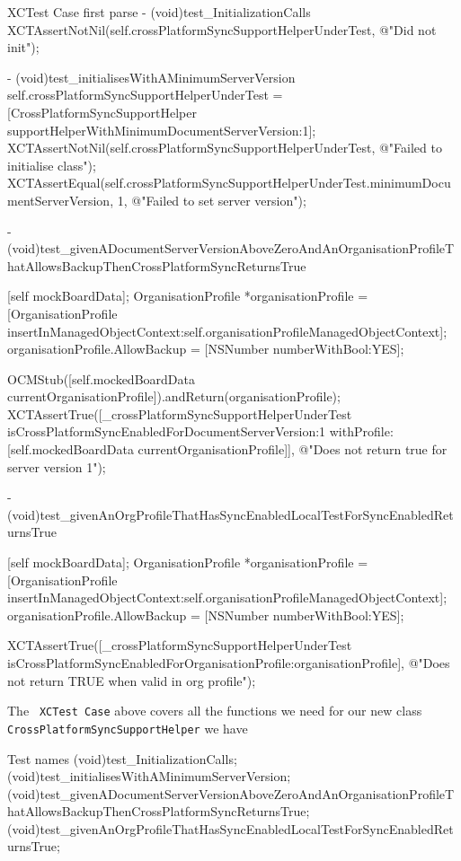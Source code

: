 \documentclass[a4paper, titlepage]{article}
\begin{document}
  \begin{listbox}{1}{XCTest Case first parse}
      - (void)test_InitializationCalls
      {
          XCTAssertNotNil(self.crossPlatformSyncSupportHelperUnderTest, @"Did not init");
      }

      - (void)test_initialisesWithAMinimumServerVersion
      {
          self.crossPlatformSyncSupportHelperUnderTest = [CrossPlatformSyncSupportHelper supportHelperWithMinimumDocumentServerVersion:1];
          XCTAssertNotNil(self.crossPlatformSyncSupportHelperUnderTest, @"Failed to initialise class");
          XCTAssertEqual(self.crossPlatformSyncSupportHelperUnderTest.minimumDocumentServerVersion, 1, @"Failed to set server version");
      }

      - (void)test_givenADocumentServerVersionAboveZeroAndAnOrganisationProfileThatAllowsBackupThenCrossPlatformSyncReturnsTrue
      {
          [self mockBoardData];
          OrganisationProfile *organisationProfile = [OrganisationProfile insertInManagedObjectContext:self.organisationProfileManagedObjectContext];
          organisationProfile.AllowBackup = [NSNumber numberWithBool:YES];

          OCMStub([self.mockedBoardData currentOrganisationProfile]).andReturn(organisationProfile);
          XCTAssertTrue([_crossPlatformSyncSupportHelperUnderTest
          isCrossPlatformSyncEnabledForDocumentServerVersion:1
          withProfile: [self.mockedBoardData currentOrganisationProfile]], @"Does not return true for server version 1");
      }

      - (void)test_givenAnOrgProfileThatHasSyncEnabledLocalTestForSyncEnabledReturnsTrue
      {
          [self mockBoardData];
          OrganisationProfile *organisationProfile = [OrganisationProfile insertInManagedObjectContext:self.organisationProfileManagedObjectContext];
          organisationProfile.AllowBackup = [NSNumber numberWithBool:YES];

          XCTAssertTrue([_crossPlatformSyncSupportHelperUnderTest isCrossPlatformSyncEnabledForOrganisationProfile:organisationProfile], @"Does not return TRUE when valid in org profile");
      }
  \end{listbox}

  The \texttt{ XCTest Case} above covers all the functions we
  need for our new class 
  \texttt{CrossPlatformSyncSupportHelper} we have

    \begin{listbox}{1}{Test names}
       (void)test_InitializationCalls;
       (void)test_initialisesWithAMinimumServerVersion;
       (void)test_givenADocumentServerVersionAboveZeroAndAnOrganisationProfileThatAllowsBackupThenCrossPlatformSyncReturnsTrue;
      (void)test_givenAnOrgProfileThatHasSyncEnabledLocalTestForSyncEnabledReturnsTrue;
  \end{listbox}
\end{document}
